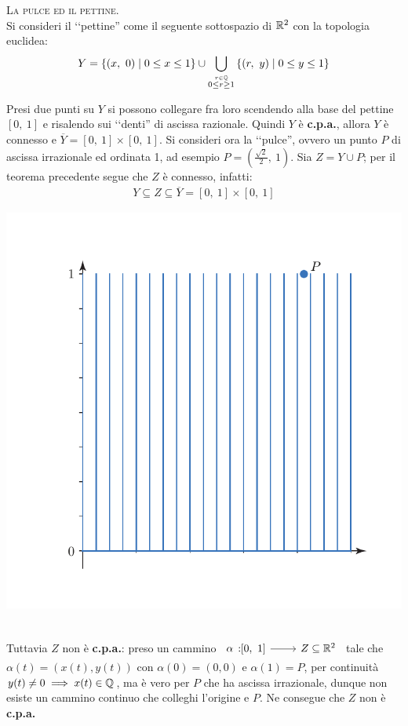 \begin{example}\textsc{La pulce ed il pettine.}\\
	Si consideri il ‘‘pettine'' come il seguente sottospazio di $\mathbb{R} ^2$ con la topologia euclidea:
		\begin{equation*}
			Y= \left\{ (x,\ 0) \mid 0\leq x\leq 1 \right\} \cup \mathop{{\bigcup}}\displaylimits_{\stackrel{r\in\mathbb{Q}}{ 0\leq r\geq 1}} \left\{ (r,\ y) \mid 0\leq y \leq 1 \right\}
		\end{equation*}
\begin{minipage}{0.62\textwidth}
Presi due punti su $Y$ si possono collegare fra loro scendendo alla base del pettine $\left[0,\ 1\right]$ e risalendo sui ‘‘denti'' di ascissa razionale. Quindi $Y$ è \textbf{c.p.a.}, allora $Y$ è connesso e $\overline{Y}=\left[0,\ 1\right]\times \left[0,\ 1\right]$.\newline
Si consideri ora la ‘‘pulce'', ovvero un punto $P$ di ascissa irrazionale ed ordinata 1, ad esempio $P=\left(\frac{\sqrt{2}}{2},\ 1\right)$. Sia $Z=Y\cup P$; per il teorema precedente segue che $Z$ è connesso, infatti:
\begin{gather*}
	Y\subseteq Z \subseteq \overline{Y}=\left[0,\ 1\right]\times \left[0,\ 1\right]	
\end{gather*}
	\end{minipage}
	\begin{minipage}{0.37\textwidth}
		\includegraphics[trim=1.1cm 0.5cm 0.5cm 1.25cm,clip,scale=0.50]{images/comb.pdf}
	\end{minipage}\\
Tuttavia $Z$ non è \textbf{c.p.a.}: preso un cammino $\funz \alpha {\left[0,\ 1\right]} {Z\subseteq \realset^2}$ tale che $\alpha(t)= \left( x(t), y(t)\right)$ con $\alpha (0)=(0,0)$ e $\alpha(1)=P$, per continuità $y(t)\neq 0 \implies x(t)\in\mathbb{Q}$, ma è vero per $P$ che ha ascissa irrazionale, dunque non esiste un cammino continuo che colleghi l'origine e $P$. Ne consegue che $Z$ non è \textbf{c.p.a.}
\end{example}

